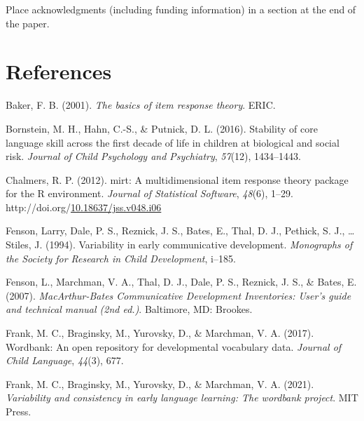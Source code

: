 \documentclass[10pt, letterpaper]{article}
\newenvironment{CSLReferences}%
  {}%
  {\par}
\begin{document}
Place acknowledgments (including funding information) in a section at
the end of the paper.

\hypertarget{references}{%
\section{References}\label{references}}

\setlength{\parindent}{-0.1in} 
\setlength{\leftskip}{0.125in}

\noindent

\hypertarget{refs}{}
\begin{CSLReferences}{1}{0}
\leavevmode\hypertarget{ref-Baker2001}{}%
Baker, F. B. (2001). \emph{The basics of item response theory}. ERIC.

\leavevmode\hypertarget{ref-bornstein2016stability}{}%
Bornstein, M. H., Hahn, C.-S., \& Putnick, D. L. (2016). Stability of
core language skill across the first decade of life in children at
biological and social risk. \emph{Journal of Child Psychology and
Psychiatry}, \emph{57}(12), 1434--1443.

\leavevmode\hypertarget{ref-R-mirt}{}%
Chalmers, R. P. (2012). {mirt}: A multidimensional item response theory
package for the {R} environment. \emph{Journal of Statistical Software},
\emph{48}(6), 1--29.
http://doi.org/\href{https://doi.org/10.18637/jss.v048.i06}{10.18637/jss.v048.i06}

\leavevmode\hypertarget{ref-fenson1994}{}%
Fenson, Larry, Dale, P. S., Reznick, J. S., Bates, E., Thal, D. J.,
Pethick, S. J., \ldots{} Stiles, J. (1994). Variability in early
communicative development. \emph{Monographs of the Society for Research
in Child Development}, i--185.

\leavevmode\hypertarget{ref-Fenson2007}{}%
Fenson, L., Marchman, V. A., Thal, D. J., Dale, P. S., Reznick, J. S.,
\& Bates, E. (2007). \emph{{M}ac{A}rthur-{B}ates {C}ommunicative
{D}evelopment {I}nventories: User's guide and technical manual (2nd
ed.)}. Baltimore, MD: Brookes.

\leavevmode\hypertarget{ref-frank2017}{}%
Frank, M. C., Braginsky, M., Yurovsky, D., \& Marchman, V. A. (2017).
Wordbank: An open repository for developmental vocabulary data.
\emph{Journal of Child Language}, \emph{44}(3), 677.

\leavevmode\hypertarget{ref-frank2021}{}%
Frank, M. C., Braginsky, M., Yurovsky, D., \& Marchman, V. A. (2021).
\emph{Variability and consistency in early language learning: The
wordbank project}. MIT Press.


\end{CSLReferences}
\end{document}
